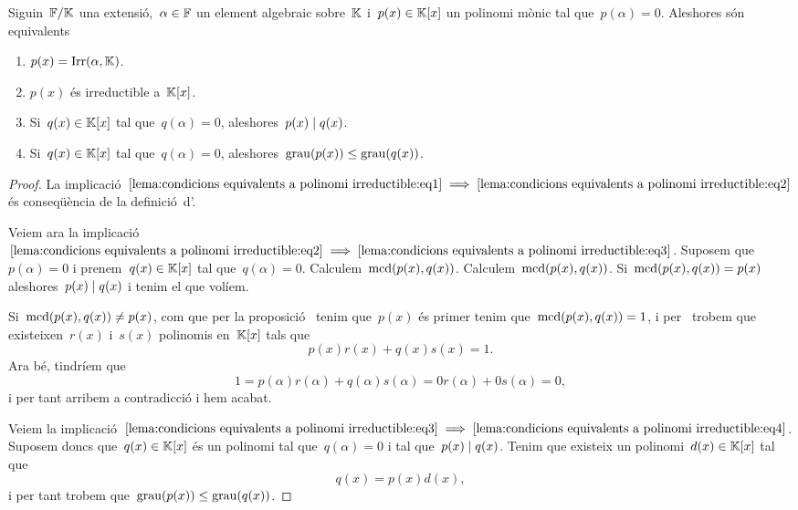 \documentclass[../Apunts.tex]{subfiles}
\begin{document}
	\begin{lemma}
		\label{lema:condicions equivalents a polinomi irreductible}
		Siguin~\(\mathbb{F}/\mathbb{K}\) una extensió,~\(\alpha\in\mathbb{F}\) un element algebraic sobre~\(\mathbb{K}\) i~\(p(x)\in\mathbb{K}[x]\) un polinomi mònic tal que~\(p(\alpha)=0\). Aleshores són equivalents
		\begin{enumerate}
		\item\label{lema:condicions equivalents a polinomi irreductible:eq1} \(p(x)=\operatorname{Irr}(\alpha,\mathbb{K})\).
		\item\label{lema:condicions equivalents a polinomi irreductible:eq2} \(p(x)\) és irreductible a~\(\mathbb{K}[x]\).
		\item\label{lema:condicions equivalents a polinomi irreductible:eq3} Si~\(q(x)\in\mathbb{K}[x]\) tal que~\(q(\alpha)=0\), aleshores~\(p(x)\mathrel{|} q(x)\).
		\item\label{lema:condicions equivalents a polinomi irreductible:eq4} Si~\(q(x)\in\mathbb{K}[x]\) tal que~\(q(\alpha)=0\), aleshores~\(\operatorname{grau}(p(x))\leq\operatorname{grau}(q(x))\).
		\end{enumerate}
		\begin{proof}
			La implicació~\(\eqref{lema:condicions equivalents a polinomi irreductible:eq1}\implies\eqref{lema:condicions equivalents a polinomi irreductible:eq2}\) és conseqüència de la definició~d'.
			
			Veiem ara la implicació~\(\eqref{lema:condicions equivalents a polinomi irreductible:eq2}\implies\eqref{lema:condicions equivalents a polinomi irreductible:eq3}\). Suposem que~\(p(\alpha)=0\) i prenem~\(q(x)\in\mathbb{K}[x]\) tal que~\(q(\alpha)=0\). Calculem~\(\operatorname{mcd}(p(x),q(x))\). Calculem~\(\operatorname{mcd}(p(x),q(x))\). Si~\(\operatorname{mcd}(p(x),q(x))=p(x)\) aleshores~\(p(x)\mathrel{|} q(x)\) i tenim el que volíem.
			
			Si~\(\operatorname{mcd}(p(x),q(x))\neq p(x)\), com que per la proposició~ tenim que~\(p(x)\) és primer tenim que~\(\operatorname{mcd}(p(x),q(x))=1\), i per~ trobem que existeixen~\(r(x)\) i~\(s(x)\) polinomis en~\(\mathbb{K}[x]\) tals que
			\[p(x)r(x)+q(x)s(x)=1.\]
			Ara bé, tindríem que
			\[
				1=p(\alpha)r(\alpha)+q(\alpha)s(\alpha)=0r(\alpha)+0s(\alpha)=0,
			\]
			i per tant arribem a contradicció i hem acabat.
			
			Veiem la implicació~\(\eqref{lema:condicions equivalents a polinomi irreductible:eq3}\implies\eqref{lema:condicions equivalents a polinomi irreductible:eq4}\). Suposem doncs que~\(q(x)\in\mathbb{K}[x]\) és un polinomi tal que~\(q(\alpha)=0\) i tal que~\(p(x)\mathrel{|} q(x)\). Tenim que existeix un polinomi~\(d(x)\in\mathbb{K}[x]\) tal que
			\[q(x)=p(x)d(x),\]
			i per tant trobem que~\(\operatorname{grau}(p(x))\leq\operatorname{grau}(q(x))\).
			

\end{proof}
\end{lemma}
\end{document}
